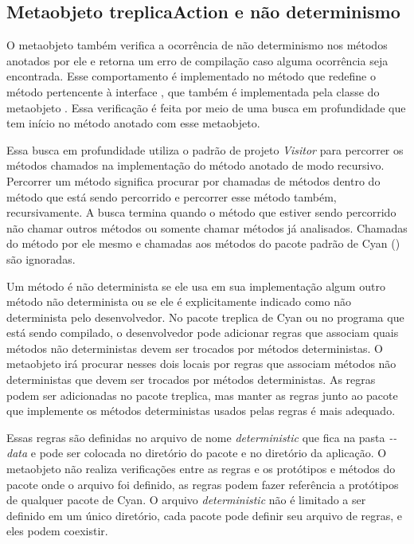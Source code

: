 \subsection{Metaobjeto \textbf{treplicaAction} e não determinismo}
\label{sec:trcyndmeta} 

O metaobjeto  também verifica a ocorrência de não determinismo nos métodos anotados por ele e retorna um erro de compilação caso alguma ocorrência seja encontrada. Esse comportamento é implementado no método que redefine o método  pertencente à interface 
, que também é implementada pela classe do metaobjeto . Essa verificação é feita por meio de uma busca em profundidade que tem início no método anotado com esse metaobjeto. 

Essa busca em profundidade utiliza o padrão de projeto \emph{Visitor} para percorrer os métodos chamados na implementação do método anotado de modo recursivo. Percorrer um método significa procurar por chamadas de métodos dentro do método que está sendo percorrido e percorrer esse método também, recursivamente. A busca termina quando o método que estiver sendo percorrido não chamar outros métodos ou somente chamar métodos já analisados. Chamadas do método por ele mesmo e chamadas aos métodos do pacote padrão de Cyan () são ignoradas.

Um método é não determinista se ele usa em sua implementação algum outro método não determinista ou se ele é explicitamente indicado como não determinista pelo desenvolvedor. No pacote treplica de Cyan ou no programa que está sendo compilado, o desenvolvedor pode adicionar regras que associam quais métodos não deterministas devem ser trocados por métodos deterministas. O metaobjeto  irá procurar nesses dois locais por regras que associam métodos não deterministas que devem ser trocados por métodos deterministas. As regras podem ser adicionadas no pacote treplica, mas manter as regras junto ao pacote que implemente os métodos deterministas usados pelas regras é mais adequado.

Essas regras são definidas no arquivo de nome \emph{deterministic} que fica na pasta \emph{-\--data} e pode ser colocada no diretório do pacote e no diretório da aplicação. O metaobjeto não realiza verificações entre as regras e os protótipos e métodos do pacote onde o arquivo foi definido, as regras podem fazer referência a protótipos de qualquer pacote de Cyan. O arquivo \emph{deterministic} não é limitado a ser definido em um único diretório, cada pacote pode definir seu arquivo de regras, e eles podem coexistir.

